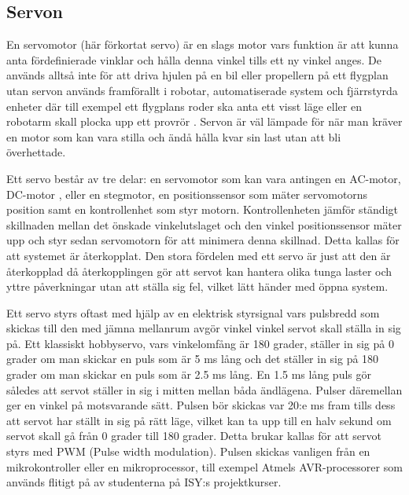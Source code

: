 \documentclass[a4paper,12pt]{article}
\begin{document}
\subsection{Servon}
 
En servomotor (här förkortat servo) är en slags motor vars funktion är att kunna anta fördefinierade  vinklar och hålla denna vinkel tills ett ny vinkel anges. De används alltså inte för att driva hjulen på en bil eller propellern på ett flygplan utan servon används framförallt i robotar, automatiserade system  och fjärrstyrda enheter där till exempel ett flygplans roder ska anta ett visst läge eller en robotarm skall plocka upp ett provrör . Servon är väl lämpade för när man kräver en motor som kan vara stilla och ändå hålla kvar sin last utan att bli överhettade. 
 
Ett servo består av tre delar: en servomotor som kan vara antingen en AC-motor, DC-motor , eller en stegmotor, en positionssensor som mäter servomotorns position samt en kontrollenhet som styr motorn.  Kontrollenheten jämför ständigt skillnaden mellan det önskade vinkelutslaget och den vinkel positionssensor mäter upp och styr sedan servomotorn för att minimera denna skillnad. Detta kallas för att systemet är återkopplat. Den stora fördelen med ett servo är just att den är återkopplad då återkopplingen gör att servot kan hantera olika tunga laster och yttre påverkningar utan att ställa sig fel, vilket lätt händer med öppna system. 
 
Ett servo styrs oftast  med hjälp av en elektrisk styrsignal vars pulsbredd som skickas till den med jämna mellanrum avgör vinkel vinkel servot skall ställa in sig på. Ett klassiskt hobbyservo, vars vinkelomfång är 180 grader, ställer in sig på 0 grader om man skickar en puls som är 5 ms lång och det ställer in sig på 180 grader om man skickar en puls som är 2.5 ms lång. En 1.5 ms lång puls gör således att servot ställer in sig i mitten mellan båda ändlägena. Pulser däremellan ger en vinkel på motsvarande sätt. Pulsen bör skickas var 20:e ms fram tills dess att servot har ställt in sig på rätt läge, vilket kan ta upp till en halv sekund om servot skall gå från 0 grader till 180 grader. Detta brukar kallas för att servot styrs med PWM (Pulse width modulation). Pulsen skickas vanligen från en mikrokontroller eller en mikroprocessor, till exempel Atmels AVR-processorer som används flitigt på av studenterna på ISY:s projektkurser.
 
\end{document}
